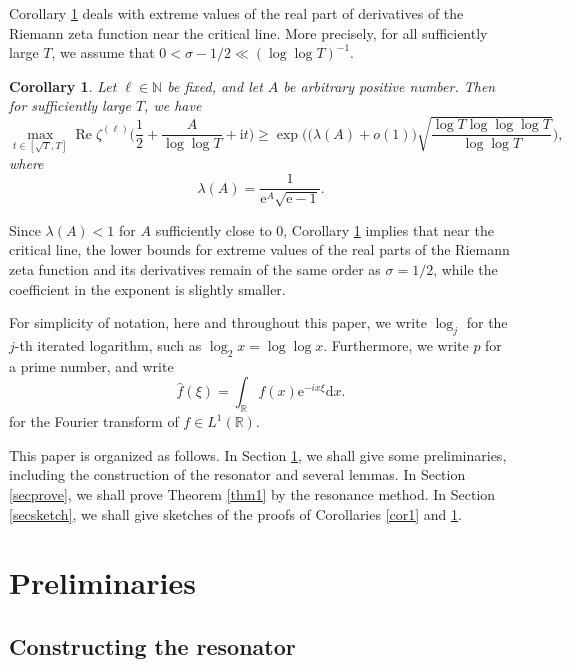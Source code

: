 \documentclass[12pt,reqno]{amsart}
\newtheorem{cor}{Corollary}
\theoremstyle{definition}
\numberwithin{equation}{section}
\newcommand{\bgl}{\big(}
\newcommand{\bgr}{\big)}
\newcommand{\bggl}{\bigg(}
\newcommand{\bggr}{\bigg)}
\newcommand{\Bgl}{\Big(}
\newcommand{\Bgr}{\Big)}
\newcommand{\lo}{\log_2}
\newcommand{\inv}{^{-1}}
\newcommand{\mbr}{\mathbb{R}}
\newcommand{\mbn}{\mathbb{N}}
\newcommand{\mmd}{\mathrm{d}}
\newcommand{\mme}{\mathrm{e}}
\newcommand{\mit}{\mathrm{i}t}
\newcommand{\re}{\operatorname{Re}}
\begin{document}
\par
Corollary \ref{cor2} deals with extreme values of the real part of derivatives of the Riemann zeta function near the critical line. More precisely, for all sufficiently large \(T\), we assume that \(0<\sigma-1/2 \ll (\log\log T)\inv\).
\begin{cor}
\label{cor2}
    Let \(\ell \in \mbn\) be fixed, and let \(A\) be arbitrary positive number. Then for sufficiently large \(T\), we have
    \[
    \max_{t \in [\sqrt{T},T]} \re \zeta^{(\ell)} \Bgl\frac{1}{2} + \frac{A}{\log\log T} +\mit\Bgr \ge \exp\bggl \bgl \lambda(A)+o(1)\bgr\sqrt{\frac{\log T \log\log\log T}{\log\log T}} \bggr,
    \]
    where
    \[
    \lambda(A) = \frac{1}{\mme^A \sqrt{\mme-1}}.
    \]
\end{cor}
\par 
Since \(\lambda(A) <1 \) for \(A\) sufficiently close to \(0\), Corollary \ref{cor2} implies that near the critical line, the lower bounds for extreme values of the real parts of the Riemann zeta function and its derivatives remain of the same order as \(\sigma=1/2\), while the coefficient in the exponent is slightly smaller.
\par
For simplicity of notation, here and throughout this paper, we write \(\log_j\) for the \(j\)-th iterated logarithm, such as \(\lo x = \log\log x\). Furthermore, we write \(p\) for a prime number, and write 
\[
\widehat{f}(\xi) = \int_\mbr f(x) \mme^{-i x \xi} \mmd x.
\]
for the Fourier transform of \(f \in L^1(\mbr)\).
\par
This paper is organized as follows. In Section \ref{secpre}, we shall give some preliminaries, including the construction of the resonator and several lemmas. In Section \ref{secprove}, we shall prove Theorem \ref{thm1} by the resonance method. In Section \ref{secsketch}, we shall give sketches of the proofs of Corollaries \ref{cor1} and \ref{cor2}.


\section{Preliminaries}
\label{secpre}

\subsection{Constructing the resonator}
\label{secConstucting}
\end{document}
